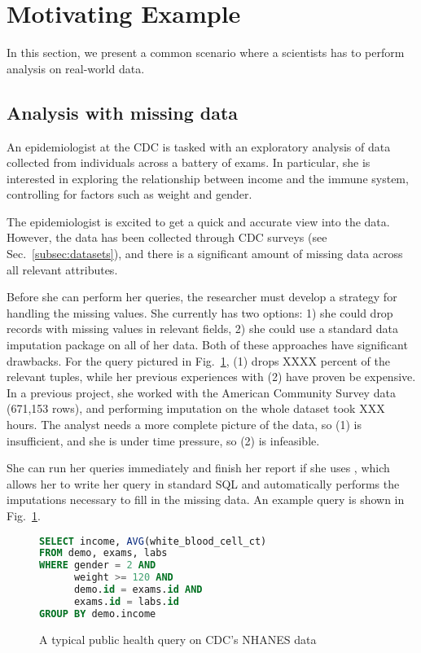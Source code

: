 \section{Motivating Example}
In this section, we present a common scenario where a scientists
has to perform analysis on real-world data.

\subsection{Analysis with missing data}
An epidemiologist at the CDC is tasked with an 
exploratory analysis of data collected from individuals across
a battery of exams. In particular, she is interested in exploring
the relationship between income and the immune system,
controlling for factors such as weight and gender.


The epidemiologist is excited
to get a quick and accurate view into the data. However,
the data has been collected through CDC surveys (see Sec.~\ref{subsec:datasets}),
and there is a significant amount of missing data across all
relevant attributes. 

Before she can perform her queries, the researcher must develop a strategy
for handling the missing values. She currently has two options:
1) she could drop records with missing values in relevant fields,
2) she could use a standard data imputation package on all of her data. Both of these
approaches have significant drawbacks. For the query pictured in 
Fig.~\ref{fig:example-query}, (1) drops XXXX percent of the relevant tuples,
while her previous experiences with (2) have proven be expensive. In a previous project, she
worked with the American Community Survey data (671,153 rows), and performing imputation on the whole
dataset took XXX hours. The analyst needs a more complete picture
of the data, so (1) is insufficient, and she is under time pressure, so (2)
is infeasible.

She can run her queries immediately and finish her report if
she uses \ProjectName{}, which allows her to write her
query in standard SQL and automatically performs the imputations necessary to fill in the missing data.
An example query is shown in Fig.~\ref{fig:example-query}.

\begin{figure}
\begin{lstlisting}[language=SQL]
SELECT income, AVG(white_blood_cell_ct)
FROM demo, exams, labs
WHERE gender = 2 AND 
      weight >= 120 AND
      demo.id = exams.id AND 
      exams.id = labs.id
GROUP BY demo.income
\end{lstlisting}
\caption{A typical public health query on CDC's NHANES data}
\label{fig:example-query}
\end{figure}

